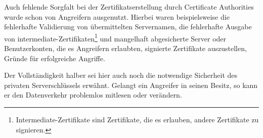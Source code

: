 Auch fehlende Sorgfalt bei der Zertifikatserstellung durch Certificate Authorities wurde schon von Angreifern ausgenutzt. Hierbei waren beispielsweise die fehlerhafte Validierung von übermittelten Servernamen, die fehlerhafte Ausgabe von intermediate-Zertifikaten\footnote{Intermediate-Zertifikate sind Zertifikate, die es erlauben, andere Zertifikate zu signieren.} und mangelhaft abgesicherte Server oder Benutzerkonten, die es Angreifern erlaubten, signierte Zertifikate auszustellen, Gründe für erfolgreiche Angriffe.

Der Vollständigkeit halber sei hier auch noch die notwendige Sicherheit des privaten Serverschlüssels erwähnt. Gelangt ein Angreifer in seinen Besitz, so kann er den Datenverkehr problemlos mitlesen oder verändern.